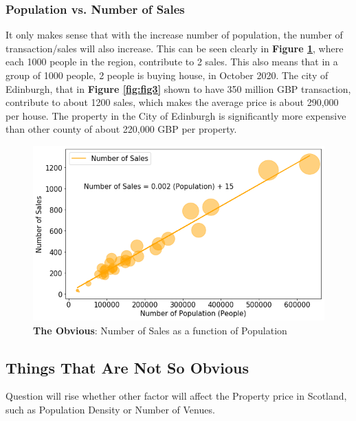 \documentclass{homeworg}
\begin{document}
\subsubsection{Population vs. Number of Sales}
It only makes sense that with the increase number of population, the number of transaction/sales will also increase. This can be seen clearly in \textbf{Figure \ref{fig:fig4}}, where each 1000 people in the region, contribute to 2 sales. This also means that in a group of 1000 people, 2 people is buying house, in October 2020. The city of Edinburgh, that in \textbf{Figure \ref{fig:fig3}} shown to have 350 million GBP transaction, contribute to about 1200 sales, which makes the average price is about 290,000 per house. The property in the City of Edinburgh is significantly more expensive than other county of about 220,000 GBP per property.
\begin{figure}[!h]
    \centering
    \includegraphics[scale=0.6]{figure/Figure_4_The_Obvious_PopulationVSNumberofSales.png}
    \caption{\textbf{The Obvious}: Number of Sales as a function of Population}
    \label{fig:fig4}
\end{figure}
\FloatBarrier
\subsection{Things That Are Not So Obvious}
Question will rise whether other factor will affect the Property price in Scotland, such as Population Density or Number of Venues.
\end{document}
